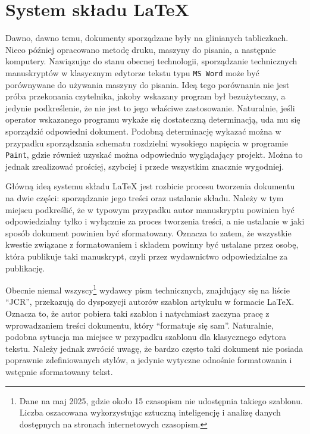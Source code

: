 \chapter{System składu \LaTeX}

Dawno, dawno temu, dokumenty sporządzane były na glinianych tabliczkach. Nieco później opracowano metodę druku, maszyny do pisania, a następnie komputery. Nawiązując do stanu obecnej technologii, sporządzanie technicznych manuskryptów w klasycznym edytorze tekstu typu \texttt{MS Word} może być porównywane do używania maszyny do pisania. Ideą tego porównania nie jest próba przekonania czytelnika, jakoby wskazany program był bezużyteczny, a jedynie podkreślenie, że nie jest to jego właściwe zastosowanie. Naturalnie, jeśli operator wskazanego programu wykaże się dostateczną determinacją, uda mu się sporządzić odpowiedni dokument. Podobną determinację wykazać można w przypadku sporządzania schematu rozdzielni wysokiego napięcia w programie \texttt{Paint}, gdzie również uzyskać można odpowiednio wyglądający projekt. Można to jednak zrealizować prościej, szybciej i przede wszystkim znacznie wygodniej.

Główną ideą systemu składu \LaTeX{} jest rozbicie procesu tworzenia dokumentu na dwie części: sporządzanie jego treści oraz ustalanie składu. Należy w tym miejscu podkreślić, że w typowym przypadku autor manuskryptu powinien być odpowiedzialny tylko i wyłącznie za proces tworzenia treści, a nie ustalanie w jaki sposób dokument powinien być sformatowany. Oznacza to zatem, że wszystkie kwestie związane z formatowaniem i składem powinny być ustalane przez osobę, która publikuje taki manuskrypt, czyli przez wydawnictwo odpowiedzialne za publikację.

Obecnie niemal wszyscy\footnote{Dane na maj 2025, gdzie około 15 czasopism nie udostępnia takiego szablonu. Liczba oszacowana wykorzystując sztuczną inteligencję i analizę danych dostępnych na stronach internetowych czasopism.} wydawcy pism technicznych, znajdujący się na liście \enquote{JCR}, przekazują do dyspozycji autorów szablon artykułu w formacie \LaTeX{}. Oznacza to, że autor pobiera taki szablon i natychmiast zaczyna pracę z wprowadzaniem treści dokumentu, który \enquote{formatuje się sam}. Naturalnie, podobna sytuacja ma miejsce w przypadku szablonu dla klasycznego edytora tekstu. Należy jednak zwrócić uwagę, że bardzo często taki dokument nie posiada poprawnie zdefiniowanych stylów, a jedynie wytyczne odnośnie formatowania i wstępnie sformatowany tekst.

